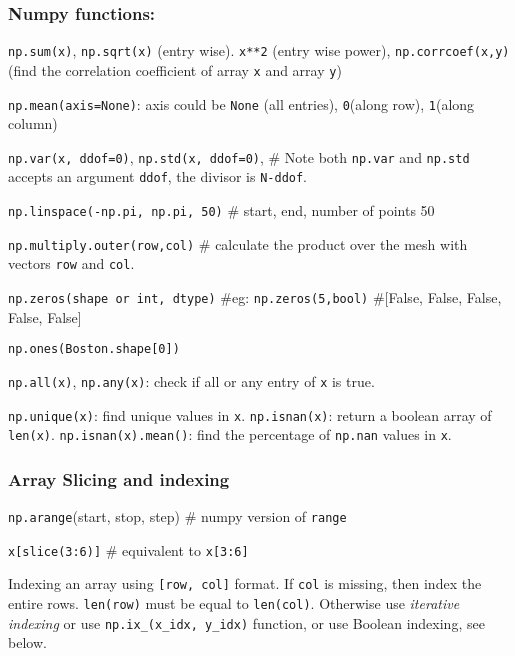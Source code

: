 \documentclass[
  letterpaper,
  DIV=11,
  numbers=noendperiod]{scrreprt}
\begin{document}
\subsubsection{Numpy functions:}\label{numpy-functions}

\texttt{np.sum(x)}, \texttt{np.sqrt(x)} (entry wise). \texttt{x**2}
(entry wise power), \texttt{np.corrcoef(x,y)} (find the correlation
coefficient of array \texttt{x} and array \texttt{y})

\texttt{np.mean(axis=None)}: axis could be \texttt{None} (all entries),
\texttt{0}(along row), \texttt{1}(along column)

\texttt{np.var(x,\ ddof=0)}, \texttt{np.std(x,\ ddof=0)}, \# Note both
\texttt{np.var} and \texttt{np.std} accepts an argument \texttt{ddof},
the divisor is \texttt{N-ddof}.

\texttt{np.linspace(-np.pi,\ np.pi,\ 50)} \# start, end, number of
points 50

\texttt{np.multiply.outer(row,col)} \# calculate the product over the
mesh with vectors \texttt{row} and \texttt{col}.

\texttt{np.zeros(shape\ or\ int,\ dtype)} \#eg:
\texttt{np.zeros(5,bool)} \#{[}False, False, False, False, False{]}

\texttt{np.ones(Boston.shape{[}0{]})}

\texttt{np.all(x)}, \texttt{np.any(x)}: check if all or any entry of
\texttt{x} is true.

\texttt{np.unique(x)}: find unique values in \texttt{x}.
\texttt{np.isnan(x)}: return a boolean array of \texttt{len(x)}.
\texttt{np.isnan(x).mean()}: find the percentage of \texttt{np.nan}
values in \texttt{x}.

\subsubsection{Array Slicing and
indexing}\label{array-slicing-and-indexing}

\texttt{np.arange}(start, stop, step) \# numpy version of \texttt{range}

\texttt{x{[}slice(3:6){]}} \# equivalent to \texttt{x{[}3:6{]}}

Indexing an array using \texttt{{[}row,\ col{]}} format. If \texttt{col}
is missing, then index the entire rows. \texttt{len(row)} must be equal
to \texttt{len(col)}. Otherwise use \emph{iterative indexing} or use
\texttt{np.ix\_(x\_idx,\ y\_idx)} function, or use Boolean indexing, see
below.
\end{document}
